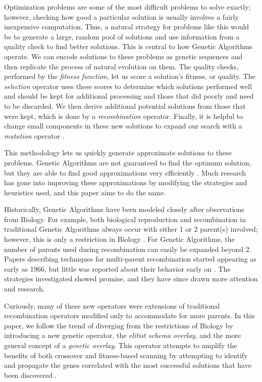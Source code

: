 Optimization problems are some of the most difficult problems to solve exactly; however, checking how good a particular solution is usually involves a fairly inexpensive computation. Thus, a natural strategy for problems like this would be to generate a large, random pool of solutions and use information from a quality check to find better solutions. This is central to how Genetic Algorithms operate. We can encode solutions to these problems as genetic sequences and then replicate the process of natural evolution on them. The quality checks, performed by the \emph{fitness function}, let us score a solution's fitness, or quality. The \emph{selection} operator uses these scores to determine which solutions performed well and should be kept for additional processing and those that did poorly and need to be discarded. We then derive additional potential solutions from those that were kept, which is done by a \emph{recombination} operator. Finally, it is helpful to change small components in these new solutions to expand our search with a \emph{mutation} operator \cite{Deb99}.

This methodology lets us quickly generate approximate solutions to these problems. Genetic Algorithms are not guaranteed to find the optimum solution, but they are able to find good approximations very efficiently \cite{Russell10}. Much research has gone into improving these approximations by modifying the strategies and heuristics used, and this paper aims to do the same.

Historically, Genetic Algorithms have been modeled closely after observations from Biology. For example, both biological reproduction and recombination in traditional Genetic Algorithms always occur with either 1 or 2 parent(s) involved; however, this is only a restriction in Biology \cite{Eiben95}. For Genetic Algorithms, the number of parents used during recombination can easily be expanded beyond 2. Papers describing techniques for multi-parent recombination started appearing as early as 1966, but little was reported about their behavior early on \cite{Eiben03}. The strategies investigated showed promise, and they have since drawn more attention and research\cite{Eiben94}. 

Curiously, many of these new operators were extensions of traditional recombination operators modified only to accommodate for more parents. In this paper, we follow the trend of diverging from the restrictions of Biology by introducing a new genetic operator, the \emph{elitist schema overlay}, and the more general concept of a \emph{genetic overlay}. This operator attempts to amplify the benefits of both crossover and fitness-based scanning by attempting to identify and propagate the genes correlated with the most successful solutions that have been discovered \cite{Russell10}. 

